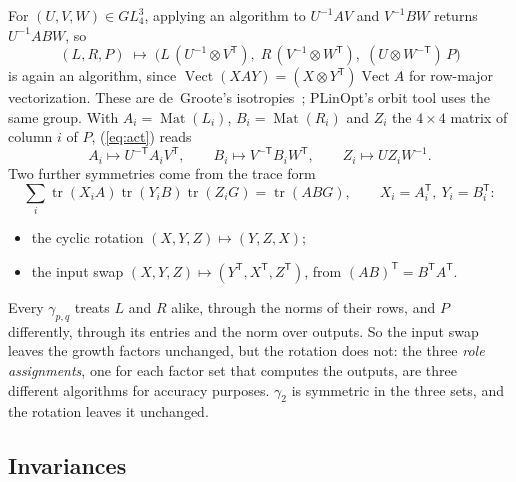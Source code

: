 \documentclass[11pt]{article}
\theoremstyle{remark}
\newcommand{\vect}{\operatorname{Vect}}
\newcommand{\Mat}{\operatorname{Mat}}
\begin{document}
For $(U,V,W)\in GL_4^3$, applying an algorithm to $U^{-1}AV$ and
$V^{-1}BW$ returns $U^{-1}ABW$, so
\begin{equation}\label{eq:act}
(L,R,P)\;\mapsto\;\bigl(L\,(U^{-1}\otimes V^{\mathsf T}),\;
R\,(V^{-1}\otimes W^{\mathsf T}),\;(U\otimes W^{-\mathsf T})\,P\bigr)
\end{equation}
is again an algorithm, since $\vect(XAY)=(X\otimes Y^{\mathsf T})\vect A$
for row-major vectorization.  These are de~Groote's
isotropies~\cite{deGroote78}; PLinOpt's orbit tool uses the same group.
With $A_i=\Mat(L_i)$, $B_i=\Mat(R_i)$ and $Z_i$ the $4\times4$ matrix of
column $i$ of $P$, (\ref{eq:act}) reads
\begin{equation}\label{eq:actmat}
A_i\mapsto U^{-\mathsf T}A_iV^{\mathsf T},\qquad
B_i\mapsto V^{-\mathsf T}B_iW^{\mathsf T},\qquad
Z_i\mapsto UZ_iW^{-1}.
\end{equation}
Two further symmetries come from the trace form
\begin{equation}\label{eq:trace}
\textstyle\sum_i\operatorname{tr}(X_iA)\operatorname{tr}(Y_iB)\operatorname{tr}(Z_iG)=\operatorname{tr}(ABG),
\qquad X_i=A_i^{\mathsf T},\ Y_i=B_i^{\mathsf T}:
\end{equation}
\begin{itemize}
\item the cyclic rotation $(X,Y,Z)\mapsto(Y,Z,X)$;
\item the input swap $(X,Y,Z)\mapsto(Y^{\mathsf T},X^{\mathsf T},Z^{\mathsf T})$,
  from $(AB)^{\mathsf T}=B^{\mathsf T}A^{\mathsf T}$.
\end{itemize}
Every $\gamma_{p,q}$ treats $L$ and $R$ alike, through the norms of
their rows, and $P$ differently, through its entries and the norm over
outputs.  So the input swap leaves the growth factors unchanged, but the
rotation does not: the three \emph{role assignments}, one for each
factor set that computes the outputs, are three different algorithms
for accuracy purposes.  $\gamma_2$ is symmetric in the three sets, and
the rotation leaves it unchanged.

\subsection{Invariances}\label{sec:inv}
\end{document}
